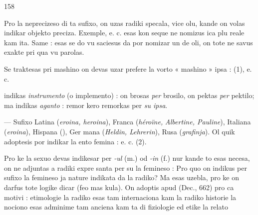 \begin{VUpage}[162]{158}

\VUcontinue
Pro la neprecizeso di ta sufixo, on uzas radiki specala, vice\nl
olu, kande on volas indikar objekto preciza. Exemple, \cc
{} e. c. esas  kon\cc
seque  ne nomizus ica plu reale kam ita. Same :\nl
{} esas  se do vu\nl
saciesus da  por nomizar un de oli, on tote ne savus\nl
exakte pri qua vu parolas.

Se traktesas pri mashino on devas uzar prefere la vorto\nl
« mashino » ipsa :  (1), \cc
{} e. c.

 indikas \textit{instrumento} (o implemento) : on brosas \textit{per}\nl
brosilo, on pektas \textit{per} pektilo; ma  indikas \textit{aganto} : remor\cc
kero remorkas per \textit{su ipsa}.

 --- Sufixo Latina (\textit{eroina, heroina}), Franca (\textit{héroïne,}\nl
\textit{Albertine, Pauline}), Italiana (\textit{eroina}), Hispana (\textit{}), Ger\cc
mana (\textit{Heldin, Lehrerin}), Rusa (\textit{grafinja}). Ol quik adoptesis\nl
por indikar la ento femina : \nl
{} e. c. (2).

Pro ke la sexuo devas indikesar per \textit{-ul} (m.) od \textit{-in} (f.)\nl
nur kande to esas necesa, on ne adjuntas  a radiki expre\cc
santa per su la femineso : \nl
{} Pro quo on indikus per sufixo la\nl
femineso ja nature indikata da la radiko? Ma  esas\nl
uzebla, pro ke on darfus tote logike dicar  (feo mas\cc
kula). On adoptis  apud  (Dec., 662) pro ca\nl
motivi : etimologie la radiko  esas tam internaciona\nl
kam la radiko  historie la nociono  esas adminime\nl
tam anciena kam ta di  fiziologie ed etike la relato\parplein
\end{VUpage}

